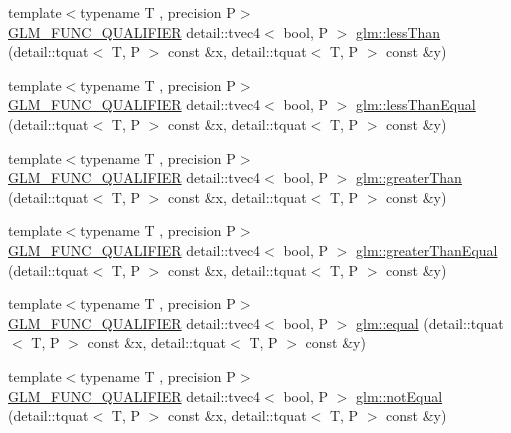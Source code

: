 \begin{DoxyCompactItemize}
\item 
{\footnotesize template$<$typename T , precision P$>$ }\\\hyperlink{setup_8hpp_a33fdea6f91c5f834105f7415e2a64407}{G\+L\+M\+\_\+\+F\+U\+N\+C\+\_\+\+Q\+U\+A\+L\+I\+F\+I\+ER} detail\+::tvec4$<$ bool, P $>$ \hyperlink{group__gtc__quaternion_ga4e4c37b86cecde7e1076c5b5fdb920b9}{glm\+::less\+Than} (detail\+::tquat$<$ T, P $>$ const \&x, detail\+::tquat$<$ T, P $>$ const \&y)
\item 
{\footnotesize template$<$typename T , precision P$>$ }\\\hyperlink{setup_8hpp_a33fdea6f91c5f834105f7415e2a64407}{G\+L\+M\+\_\+\+F\+U\+N\+C\+\_\+\+Q\+U\+A\+L\+I\+F\+I\+ER} detail\+::tvec4$<$ bool, P $>$ \hyperlink{group__gtc__quaternion_ga313fe20896a8cd43c6d08cc88fa18faa}{glm\+::less\+Than\+Equal} (detail\+::tquat$<$ T, P $>$ const \&x, detail\+::tquat$<$ T, P $>$ const \&y)
\item 
{\footnotesize template$<$typename T , precision P$>$ }\\\hyperlink{setup_8hpp_a33fdea6f91c5f834105f7415e2a64407}{G\+L\+M\+\_\+\+F\+U\+N\+C\+\_\+\+Q\+U\+A\+L\+I\+F\+I\+ER} detail\+::tvec4$<$ bool, P $>$ \hyperlink{group__gtc__quaternion_ga63be67bccef0b0ad4e60656223ab3761}{glm\+::greater\+Than} (detail\+::tquat$<$ T, P $>$ const \&x, detail\+::tquat$<$ T, P $>$ const \&y)
\item 
{\footnotesize template$<$typename T , precision P$>$ }\\\hyperlink{setup_8hpp_a33fdea6f91c5f834105f7415e2a64407}{G\+L\+M\+\_\+\+F\+U\+N\+C\+\_\+\+Q\+U\+A\+L\+I\+F\+I\+ER} detail\+::tvec4$<$ bool, P $>$ \hyperlink{group__gtc__quaternion_gac90d5af34a03cd665a349ac30e4cc44c}{glm\+::greater\+Than\+Equal} (detail\+::tquat$<$ T, P $>$ const \&x, detail\+::tquat$<$ T, P $>$ const \&y)
\item 
{\footnotesize template$<$typename T , precision P$>$ }\\\hyperlink{setup_8hpp_a33fdea6f91c5f834105f7415e2a64407}{G\+L\+M\+\_\+\+F\+U\+N\+C\+\_\+\+Q\+U\+A\+L\+I\+F\+I\+ER} detail\+::tvec4$<$ bool, P $>$ \hyperlink{group__gtc__quaternion_ga32ff2cc6fb576639a6237d8d8ed5818b}{glm\+::equal} (detail\+::tquat$<$ T, P $>$ const \&x, detail\+::tquat$<$ T, P $>$ const \&y)
\item 
{\footnotesize template$<$typename T , precision P$>$ }\\\hyperlink{setup_8hpp_a33fdea6f91c5f834105f7415e2a64407}{G\+L\+M\+\_\+\+F\+U\+N\+C\+\_\+\+Q\+U\+A\+L\+I\+F\+I\+ER} detail\+::tvec4$<$ bool, P $>$ \hyperlink{group__gtc__quaternion_gaa3a8cf1aa580e435ca96acafbd7870a5}{glm\+::not\+Equal} (detail\+::tquat$<$ T, P $>$ const \&x, detail\+::tquat$<$ T, P $>$ const \&y)
\end{DoxyCompactItemize}


